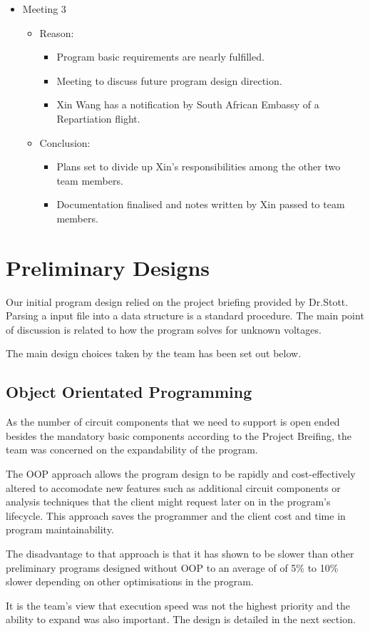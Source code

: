\documentclass[12pt,a4paper]{article}
\begin{document}
\begin{itemize}
\begin{itemize}
\begin{itemize}
			\end{itemize}
		\end{itemize}
		\item Meeting 3
		\begin{itemize}
			\item Reason:
			\begin{itemize}
				\item Program basic requirements are nearly fulfilled. 
				\item Meeting to discuss future program design direction.
				\item Xin Wang has a notification by South African Embassy of a Repartiation flight.
			\end{itemize}
			\item Conclusion:
			\begin{itemize}
				\item Plans set to divide up Xin's responsibilities among the other two team members.
				\item Documentation finalised and notes written by Xin passed to team members.
			\end{itemize}
		\end{itemize}
	\end{itemize}
	\pagebreak

	

\section{Preliminary Designs}
Our initial program design relied on the project briefing provided by Dr.Stott. Parsing a input file into a data 
structure is a standard procedure. The main point of discussion is related to how the program solves for unknown voltages.
\par
The main design choices taken by the team has been set out below.
	\subsection{Object Orientated Programming}
	As the number of circuit components that we need to support is open ended besides the mandatory basic components 
	according to the Project Breifing, the team was concerned on the expandability of the program.
	\par
	The OOP approach allows the program design to be rapidly and cost-effectively altered to accomodate new features
	such as additional circuit components or analysis techniques \cite{OOP} that the client might request later on in the 
	program's lifecycle. This approach saves the programmer and the client cost and time in program maintainability.
	\par
	The disadvantage to that approach is that it has shown to be slower than other preliminary programs designed 
	without OOP to an average of of 5\% to 10\% slower depending on other optimisations in the program.
	\par 
	It is the team's view that execution speed was not the highest priority and the ability to expand was also 
	important. The design is detailed in the next section.
\end{document}
